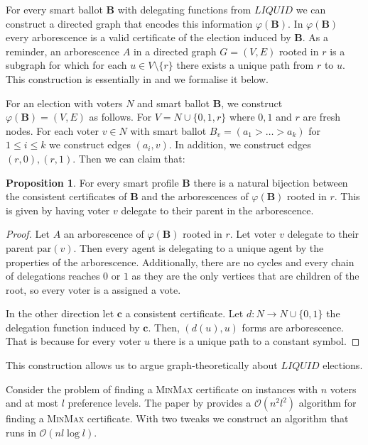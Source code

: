 \documentclass[11pt,a4paper, titlepage]{article}
\theoremstyle{definition}
\newtheorem{proposition}[theorem]{Proposition}
\let\vec\mathbf
\newcommand{\LIQUID}{\mathit{LIQUID}}
\begin{document}
For every smart ballot $\vec{B}$ with delegating functions from $\LIQUID$ we can construct a directed graph that encodes this information $\varphi(\vec{B})$. In $\varphi(\vec{B})$ every arborescence is a valid certificate of the election induced by $\vec{B}$. As a reminder, an arborescence $A$ in a directed graph $G = (V, E)$ rooted in $r$ is a subgraph for which for each $u \in V \setminus \{r\}$  there exists a unique path from $r$ to $u$. This construction is essentially in \citet{grandi} and we formalise it below.

For an election with voters $N$ and smart ballot $\vec{B}$, we construct $\varphi(\vec{B}) = (V, E)$ as follows.
For $V = N \cup \{0, 1, r\}$ where $0, 1$ and  $r$ are fresh nodes. For each voter $v \in N$ with smart ballot $B_v = (a_1 > \ldots > a_k)$ for $ 1 \leq i \leq k$ we construct edges $(a_i, v)$.
In addition, we construct edges $(r, 0), (r, 1)$.
Then we can claim that:

\begin{proposition}
    For every smart profile $\vec{B}$ there is a natural bijection between the consistent certificates of $\vec{B}$ and the arborescences of $\varphi(\vec{B})$ rooted in $r$. This is given by having voter $v$ delegate to their parent in the arborescence.
\end{proposition}

\begin{proof}
    Let $A$ an arborescence of $\varphi(\vec{B})$ rooted in $r$.
    Let voter $v$ delegate to their parent $\mathrm{par}(v)$.
    Then every agent is delegating to a unique agent by the properties of the arborescence.
    Additionally, there are no cycles and every chain of delegations reaches $0$ or $1$ as they are the only vertices that are children of the root, so every voter is a assigned a vote.

    In the other direction let $\vec{c}$ a consistent certificate. 
    Let $d \colon N \longrightarrow N \cup\{0, 1\}$ the delegation function induced by $\vec{c}$.
    Then, $(d(u), u)$ forms are arborescence.
    That is because for every voter $u$ there is a unique path to a constant symbol.
\end{proof} 
This construction allows us to argue graph-theoretically about $\LIQUID$ elections.

Consider the problem of finding a \textsc{MinMax} certificate on instances with $n$ voters and at most $l$ preference levels.
The paper by \citet{grandi} provides a $\mathcal{O}(n^2l^2)$ algorithm for finding a \textsc{MinMax} certificate. With two tweaks we construct an algorithm that runs in $\mathcal{O}(nl \log l)$.
\end{document}
